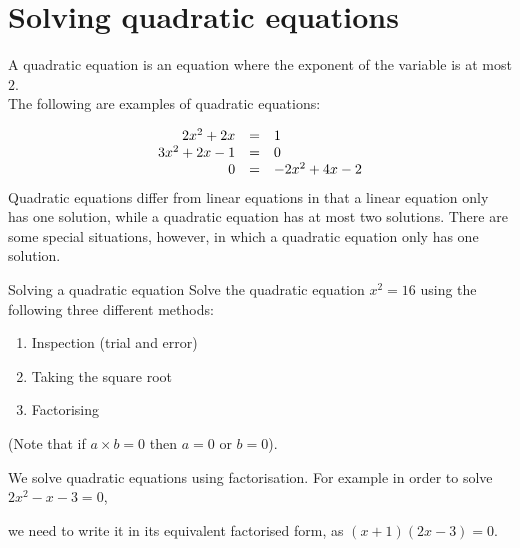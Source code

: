 \section{Solving quadratic equations}

A quadratic equation is an equation where the exponent of the variable is at most
$2$. \\The following are examples of quadratic equations:\par 


\begin{equation*}
    \begin{array}{ccl}\hfill 2{x}^{2}+2x& =& 1\hfill \\
	\hfill 3{x}^{2}+2x-1&=&0 \\ 
	\hfill 0&=&-2{x}^{2}+4x-2\hfill 
    \end{array}
\end{equation*}
Quadratic equations differ from linear equations in that a linear
equation only has one solution, while a quadratic equation has at most
two solutions. There are some special situations, however, in which a quadratic equation only
has one solution.

\begin{activity}{Solving a quadratic equation}
Solve the quadratic equation $x^{2}=16$ using the following three different methods:
\begin{enumerate}[noitemsep, label=\textbf{\arabic*}. ] 
\item Inspection (trial and error)
\item Taking the square root
\item Factorising
\end{enumerate}
(Note that if $a \times b = 0$ then $a = 0$ or $b=0$).
\end{activity}

We solve quadratic equations using factorisation. For example in order to solve $2{x}^{2}-x-3 = 0$,

we need to write it in its equivalent factorised form, as $(x+1)(2x-3)=0$.


